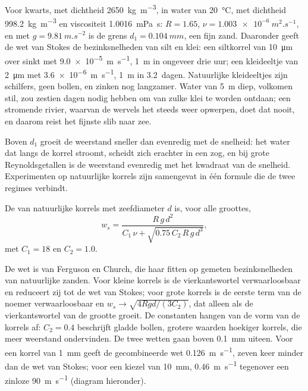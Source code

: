 Voor kwarts, met dichtheid \qty{2650}{kg.m^{-3}}, in water van \qty{20}{\celsius}, met dichtheid \qty{998.2}{kg.m^{-3}} en viscositeit \qty{1.0016}{mPa.s}: $R =
1.65$, $\nu = \qty{1.003e-6}{m^2.s^{-1}}$, en met $g =
\qty{9.81}{m.s^{-2}}$ is de grens $d_1 = \qty{0.104}{mm}$, een fijn zand. Daaronder geeft de wet van Stokes de bezinksnelheden van silt en klei: een siltkorrel van \qty{10}{\micro m} over sinkt met \qty{9.0e-5}{m.s^{-1}}, \qty{1}{m} in ongeveer drie uur; een kleideeltje van \qty{2}{\micro m} met \qty{3.6e-6}{m.s^{-1}}, \qty{1}{m} in \num{3.2}~dagen. Natuurlijke kleideeltjes zijn schilfers, geen bollen, en zinken nog langzamer. Water van \qty{5}{m} diep, volkomen stil, zou zestien dagen nodig hebben om van zulke klei te worden ontdaan; een stromende rivier, waarvan de wervels het steeds weer opwerpen, doet dat nooit, en daarom reist het fijnste slib naar zee.

Boven $d_1$ groeit de weerstand sneller dan evenredig met de snelheid: het water dat langs de korrel stroomt, scheidt zich erachter in een zog, en bij grote Reynoldsgetallen is de weerstand evenredig met het kwadraat van de snelheid. Experimenten op natuurlijke korrels zijn samengevat in één formule die de twee regimes verbindt.

\begin{proposition}\label{prop:b1:erosion-transport:combined}
De  van natuurlijke korrels met zeefdiameter $d$ is, voor alle groottes,
\[
  w_s = \frac{R\,g\,d^2}{C_1\,\nu + \sqrt{0.75\,C_2\,R\,g\,d^3}},
\]
met $C_1 = 18$ en $C_2 = 1.0$.
\end{proposition}
\admitted

De wet is van Ferguson en Church, die haar fitten op gemeten bezinksnelheden van natuurlijke zanden. Voor kleine korrels is de vierkantswortel verwaarloosbaar en reduceert zij tot de wet van Stokes; voor grote korrels is de eerste term van de noemer verwaarloosbaar en $w_s \to \sqrt{4 R g d/(3 C_2)}$, dat alleen als de vierkantswortel van de grootte groeit. De constanten hangen van de vorm van de korrels af: $C_2 = 0.4$ beschrijft gladde bollen, grotere waarden hoekiger korrels, die meer weerstand ondervinden. De twee wetten gaan boven \qty{0.1}{mm} uiteen. Voor een korrel van \qty{1}{mm} geeft de gecombineerde wet \qty{0.126}{m.s^{-1}}, zeven keer minder dan de wet van Stokes; voor een kiezel van \qty{10}{mm}, \qty{0.46}{m.s^{-1}} tegenover een zinloze \qty{90}{m.s^{-1}} (diagram hieronder).

